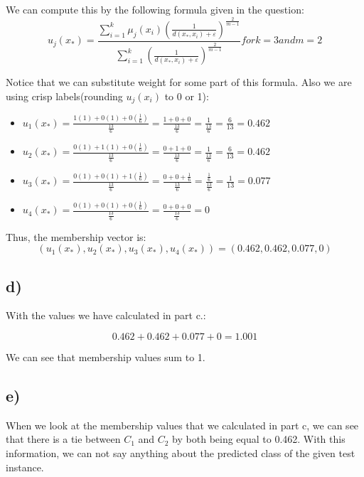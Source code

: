 \documentclass[12pt,a4paper]{article}
\begin{document}
We can compute this by the following formula given in the question:
$$u_j(x_*) = \frac{\sum_{i=1}^k \mu_j(x_i) \left( \frac{1}{d(x_*, x_i) + \varepsilon} \right)^{\frac{2}{m-1}}}{\sum_{i=1}^k \left( \frac{1}{d(x_*, x_i) + \varepsilon} \right)^{\frac{2}{m-1}}} for k=3 and m=2$$

Notice that we can substitute weight for some part of this formula. Also we are using crisp labels(rounding $ u_j(x_i)$ to 0 or 1):

\begin{itemize}
    \item $\displaystyle u_1(x_*) = \frac{1(1) + 0(1) + 0\left(\frac{1}{6}\right)}{\frac{13}{6}} = \frac{1 + 0 + 0}{\frac{13}{6}} = \frac{1}{\frac{13}{6}} = \frac{6}{13} = 0.462$
    
    \item $\displaystyle u_2(x_*) = \frac{0(1) + 1(1) + 0\left(\frac{1}{6}\right)}{\frac{13}{6}} = \frac{0 + 1 + 0}{\frac{13}{6}} = \frac{1}{\frac{13}{6}} = \frac{6}{13} = 0.462$
    
    \item $\displaystyle u_3(x_*) = \frac{0(1) + 0(1) + 1\left(\frac{1}{6}\right)}{\frac{13}{6}} = \frac{0 + 0 + \frac{1}{6}}{\frac{13}{6}} = \frac{\frac{1}{6}}{\frac{13}{6}} = \frac{1}{13} = 0.077$
    
    \item $\displaystyle u_4(x_*) = \frac{0(1) + 0(1) + 0\left(\frac{1}{6}\right)}{\frac{13}{6}} = \frac{0 + 0 + 0}{\frac{13}{6}} = 0$
\end{itemize}

Thus, the membership vector is:
$$(u_1(x_*), u_2(x_*), u_3(x_*), u_4(x_*)) = \left( 0.462, 0.462, 0.077, 0 \right)$$

\subsection*{d)}

With the values we have calculated in part c.:

$$ 0.462 + 0.462 + 0.077 + 0 = 1.001 $$

We can see that membership values sum to 1.

\subsection*{e)}

When we look at the membership values that we calculated in part c, we can see that there is a tie between $C_1$ and $C_2$ by both being equal to 0.462. With this information, we can not say anything about the predicted class of the given test instance.
\end{document}
